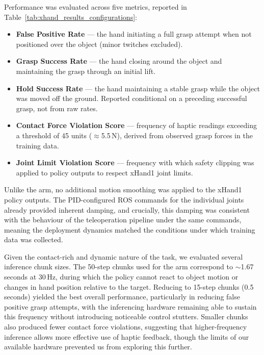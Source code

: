 \documentclass[conference]{IEEEtran}
\begin{document}
Performance was evaluated across five metrics, reported in 
Table~\ref{tab:xhand_results_configurations}:

\begin{itemize}
    \item \textbf{False Positive Rate} --- the hand initiating a full grasp 
    attempt when not positioned over the object (minor twitches excluded).
    \item \textbf{Grasp Success Rate} --- the hand closing around the object 
    and maintaining the grasp through an initial lift.
    \item \textbf{Hold Success Rate} --- the hand maintaining a stable grasp 
    while the object was moved off the ground. Reported conditional on a 
    preceding successful grasp, not from raw rates.
    \item \textbf{Contact Force Violation Score} --- frequency of haptic 
    readings exceeding a threshold of 45 units ($\approx$5.5\,N), derived 
    from observed grasp forces in the training data.
    \item \textbf{Joint Limit Violation Score} --- frequency with which safety 
    clipping was applied to policy outputs to respect xHand1 joint limits.
\end{itemize}

Unlike the arm, no additional motion smoothing was applied to the xHand1 policy outputs. The PID-configured ROS commands for the individual joints already provided inherent damping, and crucially, this damping was consistent with the behaviour of the teleoperation pipeline under the same commands, meaning the deployment dynamics matched the conditions under which training data was collected.

Given the contact-rich and dynamic nature of the task, we evaluated several inference chunk sizes. The 50-step chunks used for the arm correspond to $\sim$1.67 seconds at 30\,Hz, during which the policy cannot react to object motion or changes in hand position relative to the target. Reducing to 15-step chunks (0.5 seconds) yielded the best overall performance, particularly in reducing false positive grasp attempts, with the inferencing hardware remaining able to sustain this frequency without introducing noticeable control stutters. Smaller chunks also produced fewer contact force violations, suggesting that higher-frequency inference allows more effective use of haptic feedback, though the limits of our available hardware prevented us from exploring this further.
\end{document}
